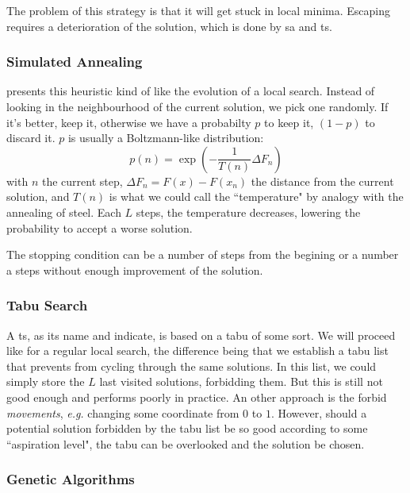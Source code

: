\documentclass[12pt,a4paper]{article}
\theoremstyle{customdef}
\begin{document}
The problem of this strategy is that it will get stuck in local minima.
Escaping requires a deterioration of the solution, which is done by \gls{sa} and \gls{ts}.

\subsubsection{Simulated Annealing}
\cite{Pirlot1996} presents this heuristic kind of like the evolution of a local search.
Instead of looking in the neighbourhood of the current solution, we pick one randomly.
If it's better, keep it, otherwise we have a probabilty $p$ to keep it, $(1-p)$ to discard it.
$p$ is usually a Boltzmann-like distribution:
\[p(n) = \exp{\left(-\frac{1}{T(n)} \Delta F_n\right)}\]
with $n$ the current step, $\Delta F_n = F(x) - F(x_n)$ the distance from the current solution, and $T(n)$ is what we could call the ``temperature" by analogy with the annealing of steel.
Each $L$ steps, the temperature decreases, lowering the probability to accept a worse solution.

The stopping condition can be a number of steps from the begining or a number a steps without enough improvement of the solution.

\subsubsection{Tabu Search}
A \acrlong{ts}, as its name and \cite{Pirlot1996} indicate, is based on a tabu of some sort.
We will proceed like for a regular local search, the difference being that we establish a tabu list that prevents from cycling through the same solutions.
In this list, we could simply store the $L$ last visited solutions, forbidding them.
But this is still not good enough and performs poorly in practice.
An other approach is the forbid \textit{movements}, \textit{e.g.} changing some coordinate from $0$ to $1$.
However, should a potential solution forbidden by the tabu list be so good according to some ``aspiration level", the tabu can be overlooked and the solution be chosen.

\subsubsection{Genetic Algorithms}
\end{document}
